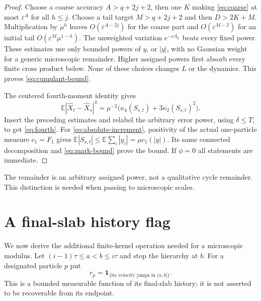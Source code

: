 \documentclass[11pt]{article}
\newcommand{\E}{\mathbb E}
\newcommand{\eps}{\varepsilon}
\newcommand{\ind}{\mathbf1}
\theoremstyle{definition}\newtheorem{definition}[theorem]{Definition}
\theoremstyle{remark}\newtheorem{remark}[theorem]{Remark}
\numberwithin{equation}{section}
\begin{document}
\begin{proof}
Choose a coarse accuracy $A>q+2j+2$, then one $K$ making
\eqref{eq:coarse} at most $\eps^A$ for all $h\le j$. Choose a tail target
$M>q+2j+2$ and then $D>2K+M$. Multiplication by $\mu^h$ leaves
$O(\eps^{A-2j})$ for the coarse part and
$O(\eps^{M-2})$ for an initial tail
$O(\eps^M\mu^{1-h})$. The unweighted variation
$e^{-c\Lambda_L}$ beats every fixed power. These estimates use only bounded
powers of $y$, or $|y|$, with no Gaussian weight for a generic microscopic
remainder. Higher assigned powers first absorb every finite cross product
below. None of these choices changes $L$ or the dynamics.
This proves \eqref{eq:cumulant-bound}.

The centered fourth-moment identity gives
\[
 \E|\widehat X_t-\widehat X_s|^4
     =\mu^{-2}\bigl(\kappa_4(S_{s,t})+3\kappa_2(S_{s,t})^2\bigr).
\]
Insert the preceding estimates and relabel the arbitrary error power,
using $\delta\le T$, to get \eqref{eq:fourth}. For
\eqref{eq:absolute-increment}, positivity of the actual one-particle
measure $c_1=F_1$ gives
$\E|S_{s,t}|\le\E\sum_i|y_i|=\mu c_1(|y|)$.
Its same connected decomposition and \eqref{eq:mark-bound} prove the bound.
If $\phi=0$ all statements are immediate.
\end{proof}
The remainder is an arbitrary assigned power, not a qualitative cycle
remainder. This distinction is needed when passing to microscopic scales.

\section{A final-slab history flag}\label{sec:flags}
We now derive the additional finite-kernel operation needed for a microscopic
modulus. Let $(i-1)\tau\le a<b\le i\tau$ and stop the hierarchy at $b$.
For a designated particle $p$ put
\[
 r_p=\ind_{\{\text{its velocity jumps in }(a,b]\}}.
\]
This is a bounded measurable function of its final-slab history; it is not
asserted to be recoverable from its endpoint.
\end{document}
